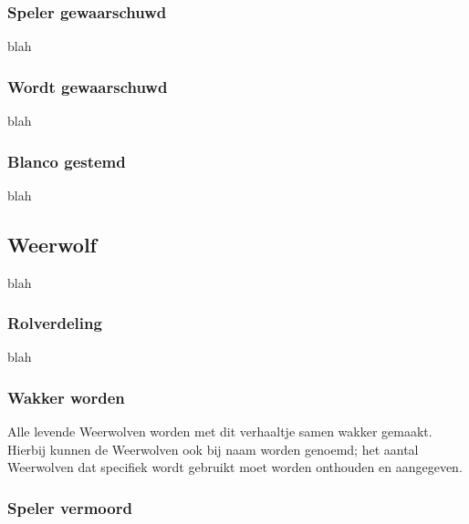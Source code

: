 \documentclass[12pt]{article}
\begin{document}
    \subsubsection{Speler gewaarschuwd}
    
      blah
    
    \subsubsection{Wordt gewaarschuwd}
    
      blah
    
    \subsubsection{Blanco gestemd}
    
      blah
  
  \subsection{Weerwolf}
    
      blah
  
    \subsubsection{Rolverdeling}
    
      blah
    
    \subsubsection{Wakker worden}
    
    Alle levende Weerwolven worden met dit verhaaltje samen wakker gemaakt. Hierbij kunnen de Weerwolven ook bij naam worden genoemd; het aantal Weerwolven dat specifiek wordt gebruikt moet worden onthouden en aangegeven.
    
    \begin{center}
    \end{center}
    
    \subsubsection{Speler vermoord}
    
\end{document}
